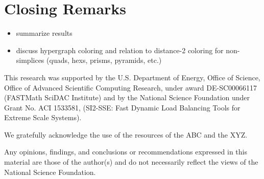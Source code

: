 \documentclass[graybox]{svmult}
\begin{document}
\section{Closing Remarks} \label{sec:closing}
\begin{itemize}
  \item summarize results
  \item discuss hypergraph coloring and relation to distance-2 coloring for non-simplices (quads, hexs, prisms, pyramids, etc.)
\end{itemize}

\begin{acknowledgement}
This research was supported by the U.S. Department of Energy, Office of Science,
Office of Advanced Scientific Computing Research, under award DE-SC00066117
(FASTMath SciDAC Institute) and by the National Science Foundation under Grant
No. ACI 1533581, (SI2-SSE: Fast Dynamic Load Balancing Tools for Extreme Scale
Systems).

We gratefully acknowledge the use of the resources of the ABC and the XYZ.

Any opinions, findings, and conclusions or recommendations expressed in this
material are those of the author(s) and do not necessarily reflect the views
of the National Science Foundation.
\end{acknowledgement}



\end{document}
